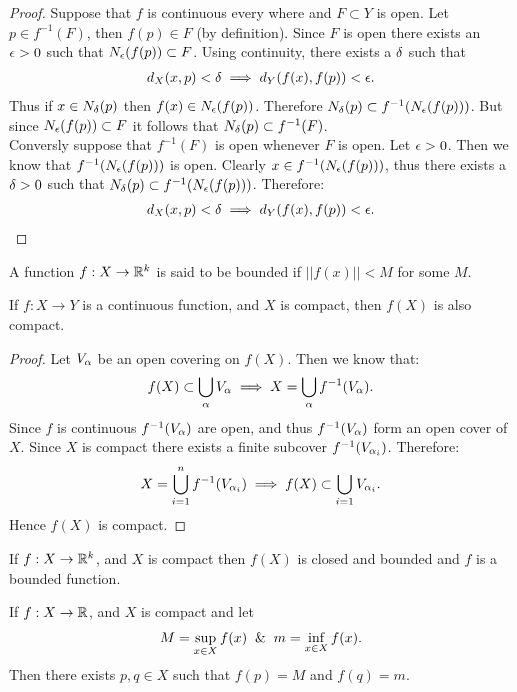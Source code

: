 \begin{proof}
  Suppose that $f$ is continuous every where and $F\subset Y$ is open. Let $p\in f^{-1}(F)$, then $f(p) \in F$ (by definition). Since $F$ is open there exists an $\epsilon>0$ such that $N_\epsilon(f(p)) \subset F$. Using continuity, there exists a $\delta$ such that
  \begin{align*}
    d_X(x,p) <\delta \implies d_Y(f(x), f(p)) <\epsilon.
  \end{align*}
  Thus if $x\in N_\delta(p)$ then $f(x) \in N_\epsilon(f(p))$. Therefore $N_\delta(p) \subset f^{-1}(N_\epsilon(f(p)))$. But since $N_\epsilon(f(p)) \subset F$ it follows that $N_\delta(p) \subset f^{-1}(F)$.\\

  Conversly suppose that $f^{-1}(F)$ is open whenever $F$ is open. Let $\epsilon>0$. Then we know that $f^{-1}(N_\epsilon(f(p)))$ is open. Clearly $x\in f^{-1}(N_\epsilon(f(p)))$, thus there exists a $\delta>0$ such that $N_\delta(p) \subset f^{-1}(N_\epsilon(f(p)))$. Therefore:
  \begin{align*}
    d_X(x,p) < \delta \implies d_Y(f(x), f(p)) < \epsilon.
  \end{align*}
\end{proof}
\begin{definition}
  A function $f:X\to \mathbb{R}^k$ is said to be bounded if $||f(x)|| <M$ for some $M$.
\end{definition}
\begin{proposition}
  If $f:X\to Y$ is a continuous function, and $X$ is compact, then $f(X)$ is also compact. 
\end{proposition}
\begin{proof}
  Let $V_\alpha$ be an open covering on $f(X)$. Then we know that:
  \begin{align*}
    f(X) \subset \bigcup_\alpha V_\alpha \implies X = \bigcup_\alpha f^{-1}(V_\alpha).
  \end{align*}
  Since $f$ is continuous $f^{-1}(V_\alpha)$ are open, and thus $f^{-1}(V_\alpha)$ form an open cover of $X$. Since $X$ is compact there exists a finite subcover $f^{-1}(V_{\alpha_i})$. Therefore:
  \begin{align*}
    X = \bigcup_{i=1}^n f^{-1}(V_{\alpha_i}) \implies f(X) \subset \bigcup_{i=1} V_{\alpha_i}.
  \end{align*}
  Hence $f(X)$ is compact.
\end{proof}
\begin{corollary}
    If $f:X \to \mathbb{R}^k$, and $X$ is compact then $f(X)$ is closed and bounded and $f$ is a bounded function. 
\end{corollary}
\begin{corollary}
  If $f:X\to \mathbb{R}$, and $X$ is compact and let
  \begin{align*}
    M = \sup_{x\in X}f(x) \And m = \inf_{x\in X} f(x).
  \end{align*}
  Then there exists $p,q\in X$ such that $f(p) = M$ and $f(q) = m$.
\end{corollary}
